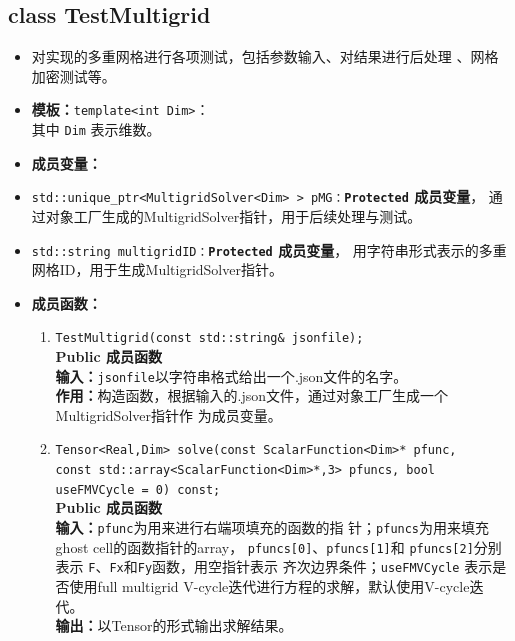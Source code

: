 \documentclass[a4paper,twoside]{ctexart}
\begin{document}
\subsection*{class TestMultigrid}
\begin{itemize}
    \item 对实现的多重网格进行各项测试，包括参数输入、对结果进行后处理
      、网格加密测试等。
    \item \textbf{模板：}\texttt{template<int Dim>}：\\
    其中 \texttt{Dim} 表示维数。
  \item \textbf{成员变量：}
    \item \texttt{std::unique\_ptr<MultigridSolver<Dim> > pMG：}\textbf{\texttt{Protected}  成员变量}，
      通过对象工厂生成的MultigridSolver指针，用于后续处理与测试。
    \item \texttt{std::string multigridID：}\textbf{\texttt{Protected}  成员变量}，
      用字符串形式表示的多重网格ID，用于生成MultigridSolver指针。
        \item \textbf{成员函数：}
          \begin{enumerate}[(1)]
             \item \texttt{TestMultigrid(const std::string\& jsonfile);}\\
          \textbf{Public 成员函数}\\
          \textbf{输入：}\texttt{jsonfile}以字符串格式给出一个$.$json文件的名字。\\
          \textbf{作用：}构造函数，根据输入的$.$json文件，通过对象工厂生成一个MultigridSolver指针作
          为成员变量。
          \item \texttt{Tensor<Real,Dim> solve(const ScalarFunction<Dim>* pfunc, \\const
                         std::array<ScalarFunction<Dim>*,3>
                         pfuncs, bool useFMVCycle = 0) const;
                       }\\
          \textbf{Public 成员函数}\\
          \textbf{输入：}\texttt{pfunc}为用来进行右端项填充的函数的指
          针；\texttt{pfuncs}为用来填充ghost cell的函数指针的array，
                \texttt{pfuncs[0]}、\texttt{pfuncs[1]}和
                \texttt{pfuncs[2]}分别表示
                \texttt{F}、\texttt{Fx}和\texttt{Fy}函数，用空指针表示
                齐次边界条件；\texttt{useFMVCycle} 表示是否使用full
                multigrid V-cycle迭代进行方程的求解，默认使用V-cycle迭
                代。 \\
          \textbf{输出：}以Tensor的形式输出求解结果。\\

\end{enumerate}
\end{itemize}
\end{document}
